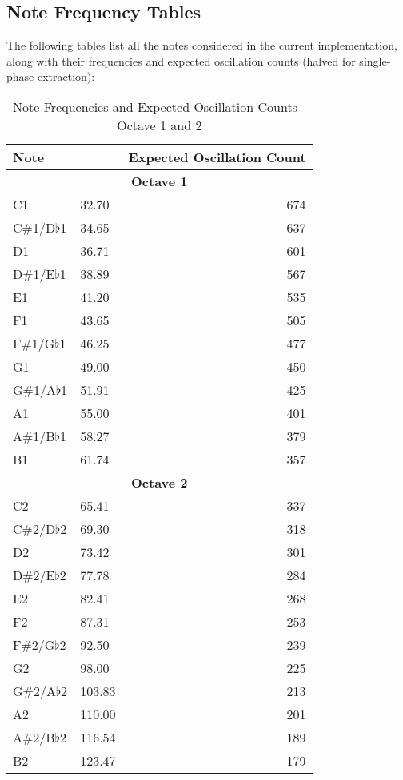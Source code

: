 \documentclass[12pt,a4paper]{article}
\begin{document}
\subsection{Note Frequency Tables}
The following tables list all the notes considered in the current implementation, along with their frequencies and expected oscillation counts (halved for single-phase extraction):

\newcommand{\notetable}[2]{
\begin{table}[H]
\centering
\footnotesize
\begin{tabularx}{\linewidth}{@{}l>{\centering\arraybackslash}Xr@{}}
\toprule
Note & \multicolumn{1}{c}{\hspace{2.75cm}Frequency (Hz)} & Expected Oscillation Count \\
\midrule
#1
\bottomrule
\end{tabularx}
\caption{Note Frequencies and Expected Oscillation Counts - Octave #2}
\label{table:note_frequencies_#2}
\end{table}
}

\newcommand{\noterow}[3]{
#1 & \hspace{2.75cm}#2 & #3 \\
}

\notetable{
\multicolumn{3}{c}{\textbf{Octave 1}} \\
\midrule
\noterow{C1}{32.70}{674}
\rowcolor{gray!10} \noterow{C\#1/D$\flat$1}{34.65}{637}
\noterow{D1}{36.71}{601}
\rowcolor{gray!10} \noterow{D\#1/E$\flat$1}{38.89}{567}
\noterow{E1}{41.20}{535}
\rowcolor{gray!10} \noterow{F1}{43.65}{505}
\noterow{F\#1/G$\flat$1}{46.25}{477}
\rowcolor{gray!10} \noterow{G1}{49.00}{450}
\noterow{G\#1/A$\flat$1}{51.91}{425}
\rowcolor{gray!10} \noterow{A1}{55.00}{401}
\noterow{A\#1/B$\flat$1}{58.27}{379}
\rowcolor{gray!10} \noterow{B1}{61.74}{357}
\midrule
\multicolumn{3}{c}{\textbf{Octave 2}} \\
\midrule
\noterow{C2}{65.41}{337}
\rowcolor{gray!10} \noterow{C\#2/D$\flat$2}{69.30}{318}
\noterow{D2}{73.42}{301}
\rowcolor{gray!10} \noterow{D\#2/E$\flat$2}{77.78}{284}
\noterow{E2}{82.41}{268}
\rowcolor{gray!10} \noterow{F2}{87.31}{253}
\noterow{F\#2/G$\flat$2}{92.50}{239}
\rowcolor{gray!10} \noterow{G2}{98.00}{225}
\noterow{G\#2/A$\flat$2}{103.83}{213}
\rowcolor{gray!10} \noterow{A2}{110.00}{201}
\noterow{A\#2/B$\flat$2}{116.54}{189}
\rowcolor{gray!10} \noterow{B2}{123.47}{179}
}{1 and 2}
\end{document}
